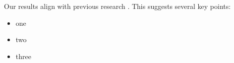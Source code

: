\documentclass[stu,12pt,floatsintext]{apa7}
\begin{document}
Our results align with previous research \citep{mujtaba2023frc}. This suggests several key points:

\begin{itemize}
    \item one
    \item two
    \item three
\end{itemize}


\end{document}
